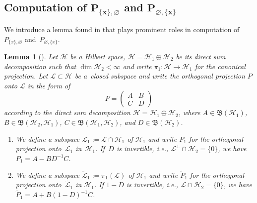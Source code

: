 \documentclass[pdftex]{sigma}
\numberwithin{equation}{section}
\newtheorem{Lemma}[Theorem]{Lemma}
\newcommand{\mfrak}[1]{\mathfrak{#1}}
\newcommand{\mcal}[1]{\mathcal{#1}}
\begin{document}
\subsection[Computation of P(x,0) and P(0,x)]{Computation of $\boldsymbol{P_{\{x\},\varnothing}}$ and $\boldsymbol{P_{\varnothing,\{x\}}}$}

We introduce a lemma found in \cite[Section~7]{BufetovOlshanski2019} that plays prominent roles in computation of~$P_{\{x\},\varnothing}$ and~$P_{\varnothing,\{x\}}$.
\begin{Lemma}[\cite{BufetovOlshanski2019}]\label{lem:projection_reduction_formula}
Let $\mcal{H}$ be a Hilbert space, $\mcal{H}=\mcal{H}_{1}\oplus \mcal{H}_{2}$ be its direct sum decomposition such that $\dim \mcal{H}_{2}<\infty$ and write $\pi_{1}\colon \mcal{H}\to\mcal{H}_{1}$ for the canonical projection. Let $\mcal{L}\subset \mcal{H}$ be a~closed subspace and write the orthogonal projection $P$ onto $\mcal{L}$ in the form of
\begin{equation*}
	P=\left(
	\begin{matrix}
	A & B \\
	C & D
	\end{matrix}
	\right)
\end{equation*}
according to the direct sum decomposition $\mcal{H}=\mcal{H}_{1}\oplus \mcal{H}_{2}$, where $A\in \mfrak{B}(\mcal{H}_{1})$, $B\in \mfrak{B}(\mcal{H}_{2},\mcal{H}_{1})$, $C\in \mfrak{B}(\mcal{H}_{1},\mcal{H}_{2})$, and $D\in \mfrak{B}(\mcal{H}_{2})$.
\begin{enumerate}\itemsep=0pt
\item[$1.$] 	We define a subspace $\mcal{L}_{1}:=\mcal{L}\cap \mcal{H}_{1}$ of $\mcal{H}_{1}$ and write $P_{1}$ for the orthogonal projection onto~$\mcal{L}_{1}$ in~$\mcal{H}_{1}$. If~$D$ is invertible, i.e., $\mcal{L}^{\perp}\cap\mcal{H}_{2}=\{0\}$, we have $P_{1}=A-BD^{-1}C$.
\item[$2.$] 	We define a subspace $\widetilde{\mcal{L}}_{1}:=\pi_{1}(\mcal{L})$ of $\mcal{H}_{1}$ and write $\widetilde{P}_{1}$ for the orthogonal projection onto~$\widetilde{\mcal{L}}_{1}$ in $\mcal{H}_{1}$. If $1-D$ is invertible, i.e., $\mcal{L}\cap\mcal{H}_{2}=\{0\}$, we have $\widetilde{P}_{1}=A+B(1-D)^{-1}C$.
\end{enumerate}
\end{Lemma}
\end{document}
